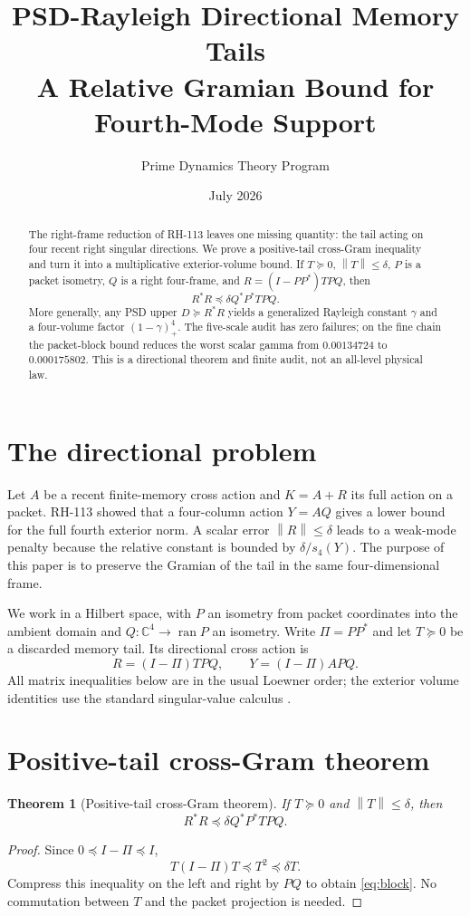 \documentclass[12pt]{article}
\title{PSD-Rayleigh Directional Memory Tails\\\large A Relative Gramian Bound for Fourth-Mode Support}
\author{Prime Dynamics Theory Program}\date{July 2026}
\newtheorem{theorem}{Theorem}\newtheorem{proposition}[theorem]{Proposition}\newtheorem{corollary}[theorem]{Corollary}\newtheorem{remark}[theorem]{Remark}
\newcommand{\norm}[1]{\left\lVert#1\right\rVert}
\begin{document}
\maketitle
\begin{abstract}
The right-frame reduction of RH-113 leaves one missing quantity: the tail
acting on four recent right singular directions.  We prove a positive-tail
cross-Gram inequality and turn it into a multiplicative exterior-volume
bound.  If $T\succeq0$, $\norm T\leq\delta$, $P$ is a packet isometry,
$Q$ is a right four-frame, and $R=(I-PP^*)TPQ$, then
\[
 R^*R\preceq\delta Q^*P^*TPQ.
\]
More generally, any PSD upper $D\succeq R^*R$ yields a generalized
Rayleigh constant $\gamma$ and a four-volume factor $(1-\gamma)_+^4$.
The five-scale audit has zero failures; on the fine chain the packet-block
bound reduces the worst scalar gamma from $0.00134724$ to $0.000175802$.
This is a directional theorem and finite audit, not an all-level physical
law.
\end{abstract}

\section{The directional problem}
Let $A$ be a recent finite-memory cross action and $K=A+R$ its full action on
a packet.  RH-113 showed that a four-column action $Y=AQ$ gives a lower bound
for the full fourth exterior norm.  A scalar error $\norm R\leq\delta$ leads
to a weak-mode penalty because the relative constant is bounded by
$\delta/s_4(Y)$.  The purpose of this paper is to preserve the Gramian of the
tail in the same four-dimensional frame.

We work in a Hilbert space, with $P$ an isometry from packet coordinates into
the ambient domain and $Q:\mathbb C^4\to\operatorname{ran}P$ an isometry.
Write $\Pi=PP^*$ and let $T\succeq0$ be a discarded memory tail.  Its
directional cross action is
\[
 R=(I-\Pi)TPQ,
 \qquad Y=(I-\Pi)APQ.
\]
All matrix inequalities below are in the usual Loewner order; the exterior
volume identities use the standard singular-value calculus
\citep{HornJohnson1991}.

\section{Positive-tail cross-Gram theorem}
\begin{theorem}[Positive-tail cross-Gram theorem]\label{thm:positive}
If $T\succeq0$ and $\norm T\leq\delta$, then
\begin{equation}\label{eq:block}
 R^*R\preceq\delta Q^*P^*TPQ.
\end{equation}
\end{theorem}
\begin{proof}
Since $0\preceq I-\Pi\preceq I$,
\[
 T(I-\Pi)T\preceq T^2\preceq\delta T.
\]
Compress this inequality on the left and right by $PQ$ to obtain
\eqref{eq:block}.  No commutation between $T$ and the packet projection is
needed.
\end{proof}
\end{document}
